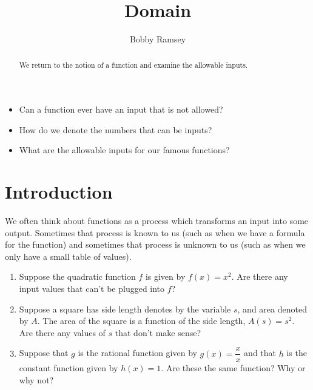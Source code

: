 \documentclass[nooutcomes]{ximera}
\author{Bobby Ramsey}
\title{Domain}
\begin{document}
\begin{abstract}
 	We return to the notion of a function and examine the allowable inputs.
\end{abstract}
\licenseORCCA
\maketitle



\begin{motivatingQuestions}\begin{itemize}
	\item Can a function ever have an input that is not allowed?
	\item How do we denote the numbers that can be inputs?
	\item What are the allowable inputs for our famous functions?
\end{itemize}\end{motivatingQuestions}

\section{Introduction}

	We often think about functions as a process which transforms an input into
	some output. Sometimes that process is known to us (such as when we have a formula for the function) and sometimes that process is unknown to us 
	(such as when we only have a small table of values). 

	\begin{exploration}
		\begin{enumerate}[label=\alph*.]
			\item Suppose the quadratic function $f$ is given by $f(x) = x^2$. Are there any input values that can't be plugged into $f$?
			\item Suppose a square has side length denotes by the variable $s$, and area denoted by $A$. The area of the square is a function of the
					side length, $A(s) = s^2$. Are there any values of $s$ that don't make sense?
			\item Suppose that $g$ is the rational function given by $g(x) = \dfrac{x}{x}$ and that $h$ is the constant function given by $h(x) = 1$. 
					Are these the same function? Why or why not?
		\end{enumerate}
	\end{exploration}
\end{document}
